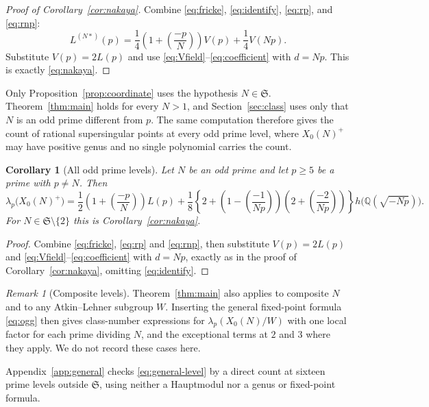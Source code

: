 \documentclass[11pt,a4paper]{article}
\newtheorem{corollary}[theorem]{Corollary}
\theoremstyle{remark}\newtheorem{remark}[theorem]{Remark}
\numberwithin{equation}{section}
\newcommand{\Q}{\mathbb Q}\newcommand{\Z}{\mathbb Z}
\newcommand{\leg}[2]{\left(\frac{#1}{#2}\right)}
\newcommand{\hK}[1]{h\bigl(\Q(\sqrt{-#1})\bigr)}
\begin{document}
\begin{proof}[Proof of Corollary~\ref{cor:nakaya}]
Combine \eqref{eq:fricke}, \eqref{eq:identify}, \eqref{eq:rp}, and \eqref{eq:rnp}:
\[
L^{(N*)}(p)=\frac14\left(1+\leg{-p}{N}\right)V(p)+\frac14V(Np).
\]
Substitute $V(p)=2L(p)$ and use \eqref{eq:Vfield}--\eqref{eq:coefficient} with $d=Np$. This is exactly \eqref{eq:nakaya}.
\end{proof}

Only Proposition~\ref{prop:coordinate} uses the hypothesis $N\in\mathfrak S$. Theorem~\ref{thm:main} holds for every $N>1$, and Section~\ref{sec:class} uses only that $N$ is an odd prime different from $p$. The same computation therefore gives the count of rational supersingular points at every odd prime level, where $X_0(N)^+$ may have positive genus and no single polynomial carries the count.

\begin{corollary}[All odd prime levels]\label{cor:general}
Let $N$ be an odd prime and let $p\geq5$ be a prime with $p\neq N$. Then
\begin{equation}\label{eq:general-level}
\lambda_p\bigl(X_0(N)^+\bigr)
=\frac12\left(1+\leg{-p}{N}\right)L(p)
+\frac18\left\{2+\left(1-\leg{-1}{Np}\right)
\left(2+\leg{-2}{Np}\right)\right\}\hK{Np}.
\end{equation}
For $N\in\mathfrak S\setminus\{2\}$ this is Corollary~\ref{cor:nakaya}.
\end{corollary}
\begin{proof}
Combine \eqref{eq:fricke}, \eqref{eq:rp} and \eqref{eq:rnp}, then substitute $V(p)=2L(p)$ and \eqref{eq:Vfield}--\eqref{eq:coefficient} with $d=Np$, exactly as in the proof of Corollary~\ref{cor:nakaya}, omitting \eqref{eq:identify}.
\end{proof}

\begin{remark}[Composite levels]
Theorem~\ref{thm:main} also applies to composite $N$ and to any Atkin--Lehner subgroup $W$. Inserting the general fixed-point formula \eqref{eq:ogg} then gives class-number expressions for $\lambda_p(X_0(N)/W)$ with one local factor for each prime dividing $N$, and the exceptional terms at $2$ and $3$ where they apply. We do not record these cases here.
\end{remark}

Appendix~\ref{app:general} checks \eqref{eq:general-level} by a direct count at sixteen prime levels outside $\mathfrak S$, using neither a Hauptmodul nor a genus or fixed-point formula.
\end{document}
